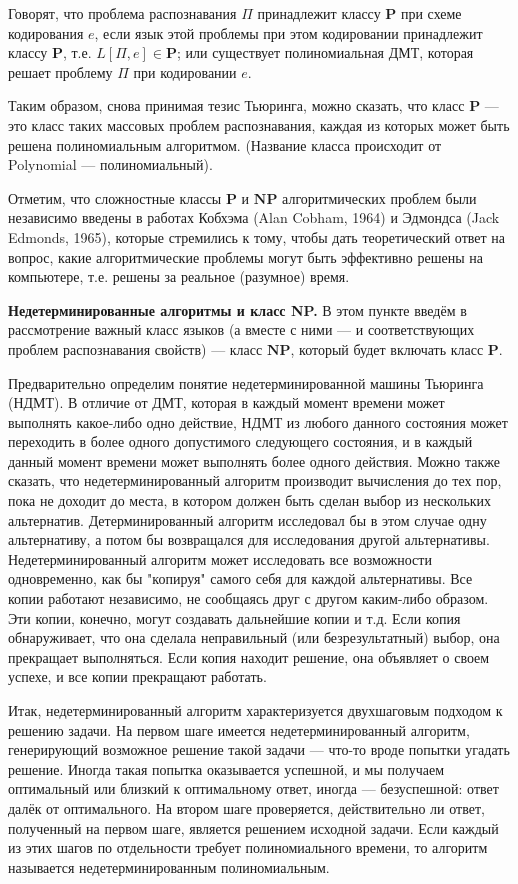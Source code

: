 \documentclass[a4paper,12pt]{article}
\begin{document}
Говорят, что проблема распознавания \(\Pi\) принадлежит классу \(\mathbf{P}\) при схеме кодирования \(e\), если язык этой проблемы при этом кодировании принадлежит классу \(\mathbf{P}\), т.е. \(L[\Pi, e] \in \mathbf{P}\); или существует полиномиальная ДМТ, которая решает проблему \(\Pi\) при кодировании \(e\).

Таким образом, снова принимая тезис Тьюринга, можно сказать, что класс \(\mathbf{P}\) --- это класс таких массовых проблем распознавания, каждая из которых может быть решена полиномиальным алгоритмом. (Название класса происходит от Polynomial --- полиномиальный).

Отметим, что сложностные классы \(\mathbf{P}\) и \(\mathbf{NP}\) алгоритмических проблем были независимо введены в работах Кобхэма (Alan Cobham, 1964) и Эдмондса (Jack Edmonds, 1965), которые стремились к тому, чтобы дать теоретический ответ на вопрос, какие алгоритмические проблемы могут быть эффективно решены на компьютере, т.е. решены за реальное (разумное) время.

\textbf{Недетерминированные алгоритмы и класс NP.} В этом пункте введём в рассмотрение важный класс языков (а вместе с ними --- и соответствующих проблем распознавания свойств) --- класс \(\mathbf{NP}\), который будет включать класс \(\mathbf{P}\).

Предварительно определим понятие недетерминированной машины Тьюринга (НДМТ). В отличие от ДМТ, которая в каждый момент времени может выполнять какое-либо одно действие, НДМТ из любого данного состояния может переходить в более одного допустимого следующего состояния, и в каждый данный момент времени может выполнять более одного действия. Можно также сказать, что недетерминированный алгоритм производит вычисления до тех пор, пока не доходит до места, в котором должен быть сделан выбор из нескольких альтернатив. Детерминированный алгоритм исследовал бы в этом случае одну альтернативу, а потом бы возвращался для исследования другой альтернативы. Недетерминированный алгоритм может исследовать все возможности одновременно, как бы "копируя" самого себя для каждой альтернативы. Все копии работают независимо, не сообщаясь друг с другом каким-либо образом. Эти копии, конечно, могут создавать дальнейшие копии и т.д. Если копия обнаруживает, что она сделала неправильный (или безрезультатный) выбор, она прекращает выполняться. Если копия находит решение, она объявляет о своем успехе, и все копии прекращают работать.

Итак, недетерминированный алгоритм характеризуется двухшаговым подходом к решению задачи. На первом шаге имеется недетерминированный алгоритм, генерирующий возможное решение такой задачи --- что-то вроде попытки угадать решение. Иногда такая попытка оказывается успешной, и мы получаем оптимальный или близкий к оптимальному ответ, иногда --- безуспешной: ответ далёк от оптимального. На втором шаге проверяется, действительно ли ответ, полученный на первом шаге, является решением исходной задачи. Если каждый из этих шагов по отдельности требует полиномиального времени, то алгоритм называется недетерминированным полиномиальным.
\end{document}
